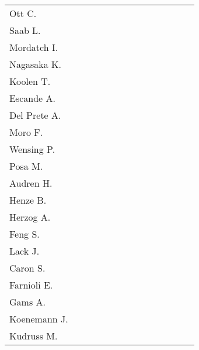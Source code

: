 \begin{table*}[t]
\begin{tabular}{|l|c|c|c|c|c|c|c|c|c|c|c|c|c|}
		Ott C.				&
		& & & & & & & \cite{Ott_Humanoids2011}	& & & & & \\
		Saab L.				&
		& & & & & & & \cite{Saab_ICRA2011} \cite{Saab_IROS2011}	& & \cite{Saab_TransRobotics2013}	& & & \\
		Mordatch I.		&
		& & & & & & & & \cite{Mordatch_SIGGRAPH2012} & & & & \\
		Nagasaka K.		&
		& & & & & & & & \cite{Nagasaka_RobotSymp2012}	& & & & \\
		Koolen T.			&
		& & & & & & & & & \cite{Koolen_Humanoids2013} & & & \cite{Koolen_IJHR2016}	\\
		Escande A.		&
		& & & & & & & & & \cite{Escande_RobAutoSys2013} & & & \\
		Del Prete A.	&
		& & & & & & & & & \cite{DelPrete_PhDThesis2013}	& \cite{DelPrete_IROS2014}
		& \cite{DelPrete_RSS2015} \cite{DelPrete_RobAutoSys2015}	& \\
		Moro F.					&
		& & & & & & & & & \cite{Moro_Humanoids2013} & & \cite{Moro_Humanoids2015} & \cite{Moro_IJHR2016}	\\
		Wensing P.			&
		& & & & & & & & & \cite{Wensing_ICRA2013} \cite{Wensing_IJHR2013}	& & & \cite{Wensing_IJHR2016}	\\
		Posa M.					&
		& & & & & & & & & \cite{Posa_HSCC2013}	& & &	\cite{Posa_ICRA2016} \cite{Posa_TransAutoControl2016}	\\
		Audren H.			&
		& & & & & & & & & & \cite{Audren_IROS2014}	& & \\
		Henze B.			&
		& & & & & & & & & & \cite{Henze_IROS2014}	& & \cite{Henze_ICRA2016} \cite{Henze_IJRR2016} \\
		Herzog A.			&
		& & & & & & & & & & \cite{Herzog_IROS2014} & \cite{Herzog_Humanoids2015}
		& \cite{Herzog_AutoRobots2016}	\\
		Feng S.				&
		& & & & & & & & & & \cite{Feng_Humanoids2014}	& & \\
		Lack J.				&
		& & & & & & & & & & \cite{Lack_ICRA2014}	& & \\
		Caron S.			&
		& & & & & & & & & & & \cite{Caron_RSS2015}	& \\
		Farnioli E.		&
		& & & & & & & & & & & \cite{Farnioli_ICRA2015}	& \\
		Gams A.				&
		& & & & & & & & & & & \cite{Gams_Robotica2015}	& \\
		Koenemann J.	&
		& & & & & & & & & & & \cite{Koenemann_IROS2015}	& \\
		Kudruss M.		&
		& & & & & & & & & & & \cite{Kudruss_Humanoids2015}	& \\

\end{tabular}
\end{table*}
